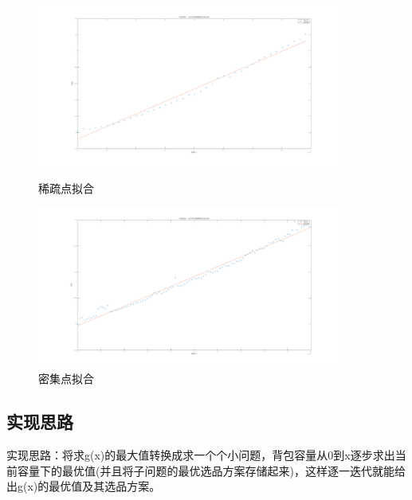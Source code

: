 \documentclass[UTF8]{ctexart}
\begin{document}
\begin{figure}[H] %
	\centering
	\begin{minipage}[t]{1\textwidth}
		\centering
		\includegraphics[width=10cm]{1.png}
		\caption{稀疏点拟合}
	\end{minipage}
	\begin{minipage}[t]{1\textwidth}
		\centering
		\includegraphics[width=10cm]{2.png}
		\caption{密集点拟合}
	\end{minipage}
\end{figure}


\subsection{实现思路}
实现思路：将求g(x)的最大值转换成求一个个小问题，背包容量从0到x逐步求出当前容量下的最优值(并且将子问题的最优选品方案存储起来)，这样逐一迭代就能给出g(x)的最优值及其选品方案。
\end{document}
